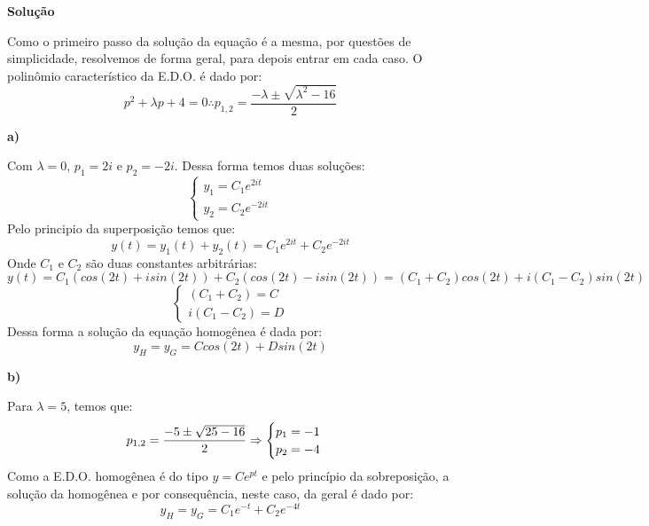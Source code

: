 \linespread{1.5}

\textbf{Solução}

Como o primeiro passo da solução da equação é a mesma, por questões de simplicidade, resolvemos de forma geral, para depois entrar em cada caso. O polinômio característico da E.D.O. é dado por:
\begin{equation*}
    p^2 + \lambda p + 4 = 0 \therefore p_{1,2} = \frac{-\lambda\pm\sqrt{\lambda^2 - 16}}{2}
\end{equation*}

\textbf{a)}

Com $\lambda=0$, $p_1 = 2i$ e $p_2=-2i$. Dessa forma temos duas soluções:
\begin{equation*}
    \begin{cases}
    y_1 = C_1e^{2it}\\
    y_2 = C_2e^{-2it}
    \end{cases}
\end{equation*}
Pelo principio da superposição temos que:
\begin{equation*}
    y(t) = y_1(t) + y_2(t) = C_1e^{2it} + C_2e^{-2it}
\end{equation*}
Onde $C_1$ e $C_2$ são duas constantes arbitrárias:
\begin{equation*}
    y(t) = C_1(cos(2t) + isin(2t)) + C_2(cos(2t) - isin(2t)) = (C_1 + C_2)cos(2t) + i(C_1-C_2)sin(2t)
\end{equation*}
\begin{equation*}
    \begin{cases}
     (C_1 + C_2) = C\\
     i(C_1-C_2) = D
    \end{cases}
\end{equation*}
Dessa forma a solução da equação homogênea é dada por:
\begin{equation*}
    \boxed{y_H = y_G = Ccos(2t) + Dsin(2t)}
\end{equation*}

\textbf{b)}

Para $\lambda=5$, temos que:
\begin{equation*}
    p_{1,2} = \frac{-5\pm \sqrt{25 - 16}}{2}\\\Rightarrow\begin{cases}
     p_1 = -1\\
     p_2 = -4
    \end{cases}
\end{equation*}
Como a E.D.O. homogênea é do tipo $y=Ce^{pt}$ e pelo princípio da sobreposição, a solução da homogênea e por consequência, neste caso, da geral é dado por:
\begin{equation*}
    \boxed{y_H = y_G = C_1e^{-t} + C_2e^{-4t}}
\end{equation*}